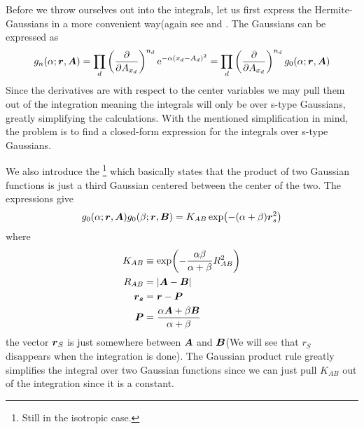     Before we throw ourselves out into the integrals, let us first express the
    Hermite-Gaussians in a more convenient way(again see
    \cite{HelgakerTaylorGauss} and \cite{HelgakerGauss}. The Gaussians can be
    expressed as
        \begin{equation}
            g_n(\alpha;\boldsymbol{{r}},\boldsymbol{{A}}) = \prod_d  \left(\frac{\mathrm{\partial}}{\mathrm{\partial} A_{x_d}}\right)^{n_d}
            \mathrm{e}^{-\alpha (x_d-A_d)^2} = \prod_d \left(\frac{\mathrm{\partial}}{\mathrm{\partial} A_{x_d}}\right)^{n_d}
            g_0(\alpha;\boldsymbol{{r}},\boldsymbol{{A}})
            \label{eq:centerDerGauss}
        \end{equation}
    Since the derivatives are with respect to the center variables we may pull
    them out of the integration meaning the integrals will only be over s-type
    Gaussians, greatly simplifying the calculations. With the mentioned
    simplification in mind, the problem is to find a closed-form expression for
    the integrals over s-type Gaussians.

    We also introduce the \footnote{Still in the
    isotropic case.} which basically states that the product of two Gaussian
    functions is just a third Gaussian centered between the center of the two.
    The expressions give
        \begin{equation}
            g_0(\alpha;\boldsymbol{{r}},\boldsymbol{{A}})g_0(\beta;\boldsymbol{{r}},\boldsymbol{{B}}) =
            K_{AB}\exp(-(\alpha+\beta)\boldsymbol{{r}}^2_s)
            \label{eq:gaussianProductRule}
        \end{equation}
    where
        \begin{equation}
            \begin{aligned}
                K_{AB} &\equiv \exp(-\frac{\alpha\beta}{\alpha+\beta}R^2_{AB})
                \\
                R_{AB} &= \abs{\boldsymbol{{A}} - \boldsymbol{{B}}} \\
                \boldsymbol{{r_s}} &= \boldsymbol{{r}} - \boldsymbol{{P}} \\
                \boldsymbol{{P}} &= \frac{\alpha\boldsymbol{{A}} +
                \beta\boldsymbol{{B}}}{\alpha + \beta}
            \end{aligned}
        \end{equation}
    the vector $\boldsymbol{{r}}_S$ is just somewhere between $\boldsymbol{{A}}$ and
    $\boldsymbol{{B}}$(We will see that $r_S$ disappears when the integration is done).
    The Gaussian product rule greatly simplifies the integral over two Gaussian
    functions since we can just pull $K_{AB}$ out of the integration since it
    is a constant.


